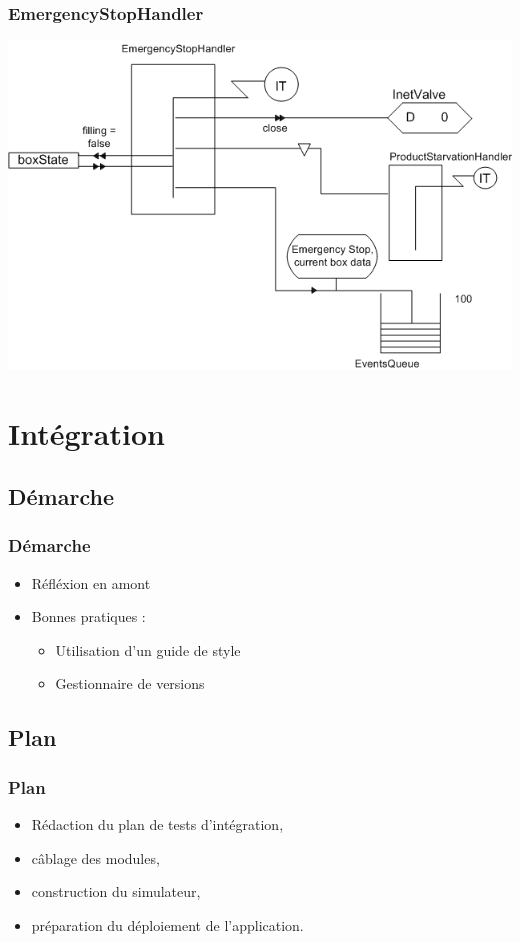 \documentclass{beamer}
\begin{document}
	\begin{frame}
	    \begin{center}
		    \frametitle{EmergencyStopHandler}
		    \includegraphics[height=0.8\textheight]{../../SchemasLCG/EmergencyStopHandler.png}
	    \end{center}
	\end{frame}

\section{Intégration}
	\subsection{Démarche}
	\begin{frame}
		\frametitle{Démarche}
		\begin{itemize}
			\item Réfléxion en amont
			\item Bonnes pratiques :
			\begin{itemize}
				\item Utilisation d'un guide de style
				\item Gestionnaire de versions
			\end{itemize}
		\end{itemize}
	\end{frame}

	\subsection{Plan}
	\begin{frame}
		\frametitle{Plan}
		\begin{itemize}
			\item Rédaction du plan de tests d'intégration,
			\item câblage des modules,
			\item construction du simulateur,
			\item préparation du déploiement de l'application.
		\end{itemize}
	\end{frame}
\end{document}
